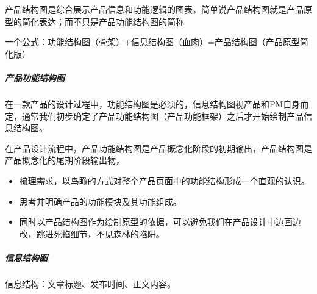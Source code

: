 \documentclass[letterpaper,10pt,english]{sphinxmanual}
\begin{document}
产品结构图是综合展示产品信息和功能逻辑的图表，简单说产品结构图就是产品原型的简化表达；而不只是产品功能结构图的简称%
\begin{footnote}[600]\sphinxAtStartFootnote
{}
%
\end{footnote}

一个公式：功能结构图（骨架）+信息结构图（血肉）=产品结构图（产品原型简化版）%
\begin{footnote}[601]\sphinxAtStartFootnote
{}
%
\end{footnote}


\subparagraph{产品功能结构图}
\label{\detokenize{chapter_knowledge/flow_chart:id34}}
在一款产品的设计过程中，功能结构图是必须的，信息结构图视产品和PM自身而定，通常我们初步确定了产品功能结构图（产品功能框架）之后才开始绘制产品信息结构图。

在产品设计流程中，产品功能结构图是产品概念化阶段的初期输出，产品结构图是产品概念化的尾期阶段输出物，
\begin{itemize}
\item {} 
梳理需求，以鸟瞰的方式对整个产品页面中的功能结构形成一个直观的认识。

\item {} 
思考并明确产品的功能模块及其功能组成。%
\begin{footnote}[602]\sphinxAtStartFootnote
{}
%
\end{footnote}

\item {} 
同时以产品结构图作为绘制原型的依据，可以避免我们在产品设计中边画边改，跳进死掐细节，不见森林的陷阱。%
\begin{footnote}[603]\sphinxAtStartFootnote
{}
%
\end{footnote}

\end{itemize}


\subparagraph{信息结构图}
\label{\detokenize{chapter_knowledge/flow_chart:id35}}
信息结构：文章标题、发布时间、正文内容。%
\begin{footnote}[604]\sphinxAtStartFootnote
{}
%
\end{footnote}
\end{document}
